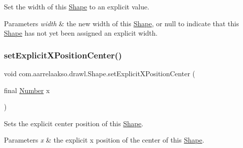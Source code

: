 Set the width of this \hyperlink{classcom_1_1aarrelaakso_1_1drawl_1_1_shape}{Shape} to an explicit value. 


\begin{DoxyParams}{Parameters}
{\em width} & the new width of this \hyperlink{classcom_1_1aarrelaakso_1_1drawl_1_1_shape}{Shape}, or {\ttfamily null} to indicate that this \hyperlink{classcom_1_1aarrelaakso_1_1drawl_1_1_shape}{Shape} has not yet been assigned an explicit width. \\
\hline
\end{DoxyParams}
\mbox{\label{classcom_1_1aarrelaakso_1_1drawl_1_1_shape_a28c766b414be0cd8767093f9be557dbd}} 
\subsubsection{\texorpdfstring{set\+Explicit\+X\+Position\+Center()}{setExplicitXPositionCenter()}\hspace{0.1cm}{\footnotesize\ttfamily [1/2]}}
{\footnotesize\ttfamily void com.\+aarrelaakso.\+drawl.\+Shape.\+set\+Explicit\+X\+Position\+Center (\begin{DoxyParamCaption}\item[{final \hyperlink{interfacecom_1_1aarrelaakso_1_1drawl_1_1_number}{Number}}]{x }\end{DoxyParamCaption})\hspace{0.3cm}{\ttfamily [protected]}}



Sets the explicit center position of this \hyperlink{classcom_1_1aarrelaakso_1_1drawl_1_1_shape}{Shape}. 


\begin{DoxyParams}{Parameters}
{\em x} & the explicit x position of the center of this \hyperlink{classcom_1_1aarrelaakso_1_1drawl_1_1_shape}{Shape}. \\
\hline
\end{DoxyParams}
\mbox{\label{classcom_1_1aarrelaakso_1_1drawl_1_1_shape_a271cd9377952616a30a434b22e22000a}} 
